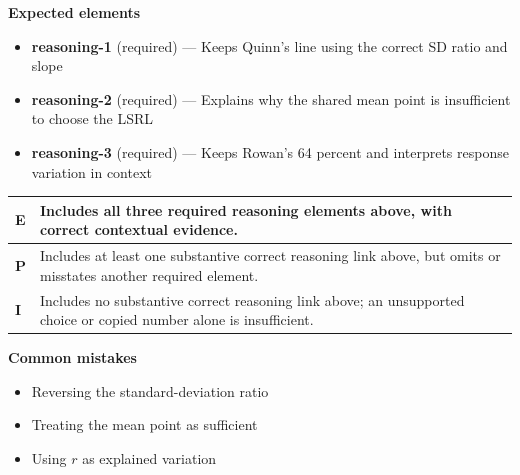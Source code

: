 \documentclass[11pt]{article}
\begin{document}

\textbf{Expected elements}
\begin{itemize}[leftmargin=1.5em,itemsep=2pt,topsep=2pt]
  \item \textbf{reasoning-1} (required) --- Keeps Quinn's line using the correct SD ratio and slope
  \item \textbf{reasoning-2} (required) --- Explains why the shared mean point is insufficient to choose the LSRL
  \item \textbf{reasoning-3} (required) --- Keeps Rowan's 64 percent and interprets response variation in context
\end{itemize}

{\small\renewcommand{\arraystretch}{1.25}
\noindent\begin{tabular}{|p{0.5in}|p{5.9in}|}
\hline
\textbf{E} & Includes all three required reasoning elements above, with correct contextual evidence. \\ \hline
\textbf{P} & Includes at least one substantive correct reasoning link above, but omits or misstates another required element. \\ \hline
\textbf{I} & Includes no substantive correct reasoning link above; an unsupported choice or copied number alone is insufficient. \\ \hline
\end{tabular}}

\textbf{Common mistakes}
\begin{itemize}[leftmargin=1.5em,itemsep=2pt,topsep=2pt]
  \item Reversing the standard-deviation ratio
  \item Treating the mean point as sufficient
  \item Using $r$ as explained variation
\end{itemize}

\clearpage
{}
\end{document}
